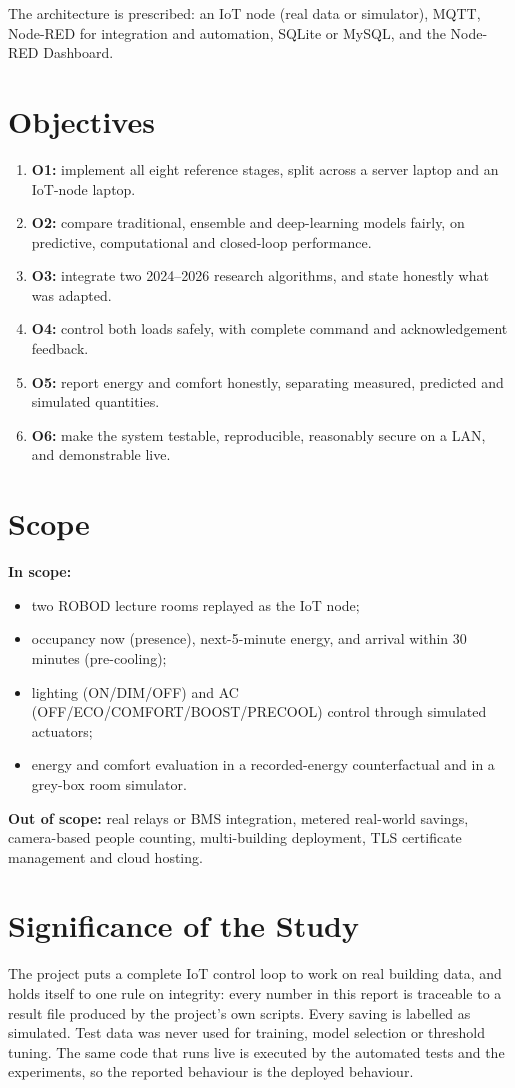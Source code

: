 \documentclass[12pt,a4paper,oneside]{report}
\begin{document}
The architecture is prescribed: an IoT node (real data or simulator), MQTT, Node-RED for integration and automation,
SQLite or MySQL, and the Node-RED Dashboard.

\section{Objectives}
\begin{enumerate}
\item \textbf{O1:} implement all eight reference stages, split across a server laptop and an IoT-node laptop.
\item \textbf{O2:} compare traditional, ensemble and deep-learning models fairly, on predictive, computational and
  closed-loop performance.
\item \textbf{O3:} integrate two 2024--2026 research algorithms, and state honestly what was adapted.
\item \textbf{O4:} control both loads safely, with complete command and acknowledgement feedback.
\item \textbf{O5:} report energy and comfort honestly, separating measured, predicted and simulated quantities.
\item \textbf{O6:} make the system testable, reproducible, reasonably secure on a LAN, and demonstrable live.
\end{enumerate}

\section{Scope}
\textbf{In scope:}
\begin{itemize}
\item two ROBOD lecture rooms replayed as the IoT node;
\item occupancy now (presence), next-5-minute energy, and arrival within 30 minutes (pre-cooling);
\item lighting (ON/DIM/OFF) and AC (OFF/ECO/COMFORT/BOOST/PRECOOL) control through simulated actuators;
\item energy and comfort evaluation in a recorded-energy counterfactual and in a grey-box room simulator.
\end{itemize}

\textbf{Out of scope:} real relays or BMS integration, metered real-world savings, camera-based people counting,
multi-building deployment, TLS certificate management and cloud hosting.

\section{Significance of the Study}
The project puts a complete IoT control loop to work on real building data, and holds itself to one rule on
integrity: every number in this report is traceable to a result file produced by the project's own scripts. Every
saving is labelled as simulated. Test data was never used for training, model selection or threshold tuning. The
same code that runs live is executed by the automated tests and the experiments, so the reported behaviour is the
deployed behaviour.
\end{document}
